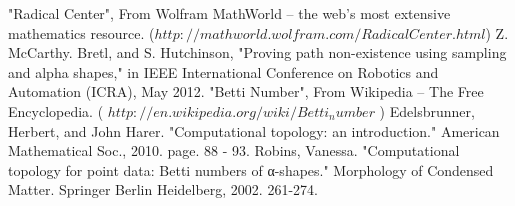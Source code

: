 \documentclass[11pt]{article}
\begin{document}
\begin{thebibliography}{1}
   "Radical Center", From Wolfram MathWorld -- the web's most extensive mathematics resource. ($http://mathworld.wolfram.com/RadicalCenter.html$)
   Z. McCarthy. Bretl, and S. Hutchinson, "Proving path non-existence using sampling and alpha shapes," in IEEE International Conference on Robotics and Automation (ICRA), May 2012.
   "Betti Number", From Wikipedia -- The Free Encyclopedia. ( $http://en.wikipedia.org/wiki/Betti_number$ )    
  Edelsbrunner, Herbert, and John Harer. "Computational topology: an introduction." American Mathematical Soc., 2010. page. 88 - 93.
   Robins, Vanessa. "Computational topology for point data: Betti numbers of α-shapes." Morphology of Condensed Matter. Springer Berlin Heidelberg, 2002. 261-274.
\end{thebibliography}
\end{document}
